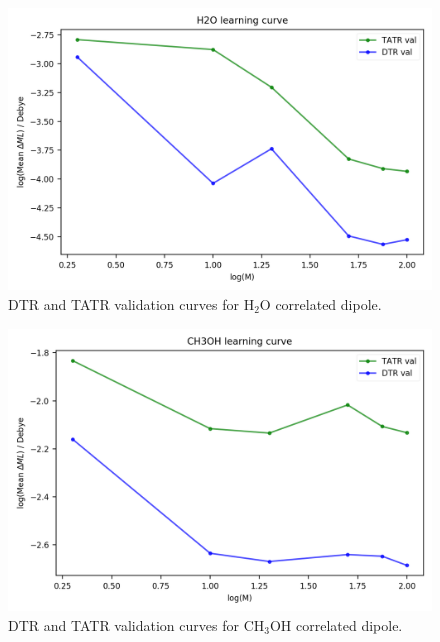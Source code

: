 \begin{figure}
    \centering
    \includegraphics[scale=1.0]{p2/figures/si/H2O_learn_log_d.png}
    \caption{DTR and TATR validation curves for H$_2$O correlated dipole.}
\end{figure}

\begin{figure}
    \centering
    \includegraphics[scale=1.0]{p2/figures/si/CH3OH_learn_log_d.png}
    \caption{DTR and TATR validation curves for CH$_3$OH correlated dipole.}
\end{figure}

